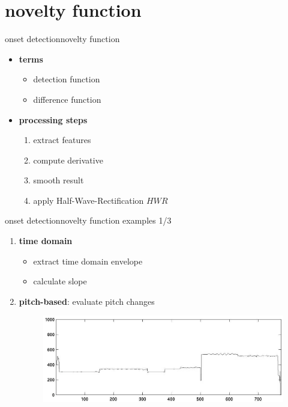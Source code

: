    \section{novelty function}
        \begin{frame}{onset detection}{novelty function}
            \begin{itemize}
                \item	\textbf{terms}
                    \begin{itemize}
                        \item	detection function
                        \item	difference function
                    \end{itemize}
                \bigskip
                \item<1->	\textbf{processing steps}
                    \begin{enumerate}
                        \item<2->	extract features
                        \item<3->	compute derivative
                        \item<4->	smooth result
                        \item<5->	apply Half-Wave-Rectification $HWR$
                    \end{enumerate}
            \end{itemize}
        \end{frame}
        \begin{frame}{onset detection}{novelty function examples 1/3}
            \begin{enumerate}
                \item	\textbf{time domain}
                    \begin{itemize}
                        \item	extract time domain envelope
                        \item<1->	calculate slope
                    \end{itemize}
                \bigskip
                \item<2->	\textbf{pitch-based}: evaluate pitch changes
                        \begin{figure}[t]
                            \centering
                            \includegraphics[scale=.25]{graph/pitch_onset}
                        \end{figure}
            \end{enumerate}
        \end{frame}
